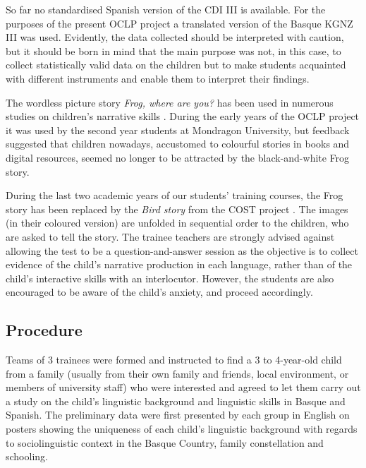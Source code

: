 \documentclass[output=paper]{../langscibook}
\begin{document}
So far no standardised Spanish version of the CDI III is available. For the purposes of the present OCLP project a translated version of the Basque KGNZ III was used. Evidently, the data collected should be interpreted with caution, but it should be born in mind that the main purpose was not, in this case, to collect statistically valid data on the children but to make students acquainted with different instruments and enable them to interpret their findings.

The wordless picture story \emph{Frog, where are you?} \citep{Mayer1969} has been used in numerous studies on children’s narrative skills \citep{BermanSlobin1994,StromquistVerhoeven2004}. During the early years of the OCLP project it was used by the second year students at Mondragon University, but feedback suggested that children nowadays, accustomed to colourful stories in books and digital resources, seemed no longer to be attracted by the black-and-white Frog story.

During the last two academic years of our students’ training courses, the Frog story has been replaced by the \emph{Bird story} from the COST project \citep{COST2012}. The images (in their coloured version) are unfolded in sequential order to the children, who are asked to tell the story. The trainee teachers are strongly advised against allowing the test to be a question-and-answer session as the objective is to collect evidence of the child's narrative production in each language, rather than of the child's interactive skills with an interlocutor. However, the students are also encouraged to be aware of the child's anxiety, and proceed accordingly.



\subsection{Procedure}

Teams of 3 trainees were formed and instructed to find a 3 to 4-year-old child from a family (usually from their own family and friends, local environment, or members of university staff) who were interested and agreed to let them carry out a study on the child’s linguistic background and linguistic skills in Basque and Spanish. The preliminary data were first presented by each group in English on posters showing the uniqueness of each child’s linguistic background with regards to sociolinguistic context in the Basque Country, family constellation and schooling.
\end{document}
